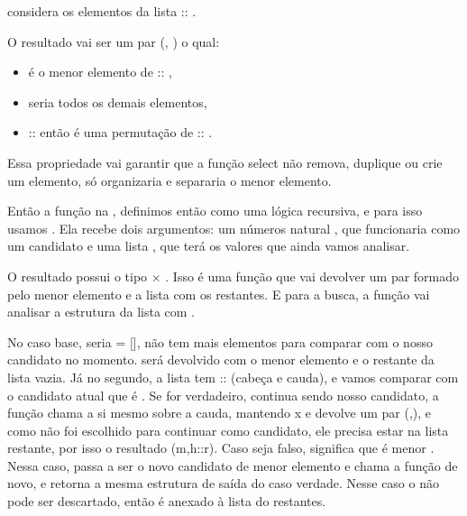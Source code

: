        considera os elementos da lista  :: .


    O resultado vai ser um par (, ) o qual:



\begin{itemize}
\item  {} é o menor elemento de  :: ,

\item  {} seria todos os demais elementos,

\item  {} ::  então é uma permutação de  :: .

\end{itemize}


    Essa propriedade vai garantir que a função select não remova, duplique ou crie um elemento, só organizaria e separaria o menor elemento.


    Então a função na , definimos então como uma lógica recursiva, e para isso usamos .
    Ela recebe dois argumentos: um números natural , que funcionaria como um candidato
    e uma lista , que terá os valores que ainda vamos analisar.


    O resultado possui o tipo  \ensuremath{\times}  . Isso é uma função que vai devolver um par formado pelo menor elemento e a lista com os restantes.
    E para a busca, a função vai analisar a estrutura da lista com   .


    No caso base, seria  = [], não tem mais elementos para comparar com o nosso candidato no momento.  será devolvido com o menor elemento e o restante da lista vazia.
    Já no segundo, a lista tem :: (cabeça e cauda), e vamos comparar  com o candidato atual que é .
    Se for verdadeiro,  continua sendo nosso candidato, a função chama a si mesmo sobre a cauda, mantendo x e devolve um par (,), e como  não foi escolhido para continuar como candidato, ele precisa estar na lista restante, por isso o resultado (m,h::r).
    Caso seja falso, significa que  é menor . Nessa caso,  passa a ser o novo candidato de menor elemento e chama a função de novo, e retorna a mesma estrutura de saída do caso verdade. Nesse caso o  não pode ser 
    descartado, então é anexado à lista do restantes.


